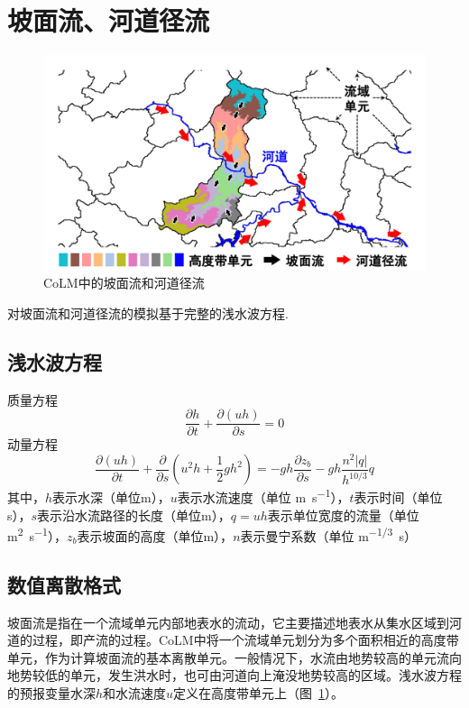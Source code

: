 \section{坡面流、河道径流}
{
\begin{figure}[htbp]
\centering
\includegraphics[width=\textwidth]{Figures/侧向流/坡面流和河道径流.pdf}
\caption{CoLM中的坡面流和河道径流}
\label{fig:坡面流和河道径流}
\end{figure}
}

对坡面流和河道径流的模拟基于完整的浅水波方程.
 \subsection{浅水波方程}
 质量方程
  \begin{equation}
 \frac{\partial h}{\partial t} + \frac{\partial \left(uh\right)}{\partial s} = 0
 \end{equation}
 动量方程
 \begin{equation}
 \frac{\partial \left(uh\right)}{\partial t} + \frac{\partial}{\partial s}\left(u^2h+\frac{1}{2}gh^2\right) = -gh\frac{\partial z_b}{\partial s}-gh\frac{n^2\left|q\right|}{h^{10/3}}q
  \end{equation}
  其中，$h$表示水深（单位m），$u$表示水流速度（单位 \unit{m.s^{-1}}），$t$表示时间（单位s），$s$表示沿水流路径的长度（单位m），$q=uh$表示单位宽度的流量（单位 \unit{m^2.s^{-1}}），$z_b$表示坡面的高度（单位m），$n$表示曼宁系数（单位 \unit{m^{-1/3}.s}）


\subsection{数值离散格式}
坡面流是指在一个流域单元内部地表水的流动，它主要描述地表水从集水区域到河道的过程，即产流的过程。CoLM中将一个流域单元划分为多个面积相近的高度带单元，作为计算坡面流的基本离散单元。一般情况下，水流由地势较高的单元流向地势较低的单元，发生洪水时，也可由河道向上淹没地势较高的区域。浅水波方程的预报变量水深$h$和水流速度$u$定义在高度带单元上（图~\ref{fig:坡面流和河道径流}）。

